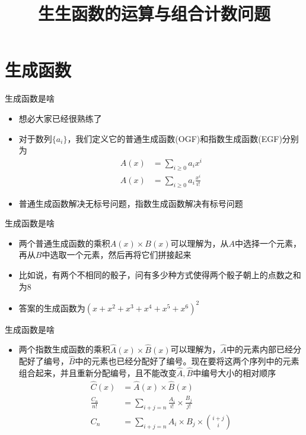 \documentclass{beamer}
\begin{document}
 

\begin{frame}
    \title{生生函数的运算与组合计数问题} 
    \begin{titlepage}
    \end{titlepage}
\end{frame} 

\section{生成函数} 

\begin{frame}{生成函数是啥}
    \begin{itemize}
        \item 想必大家已经很熟练了
        \item 对于数列$\{a_i\}$，我们定义它的普通生成函数(OGF)和指数生成函数(EGF)分别为
        $$\begin{aligned}
            A(x) &= \sum_{i\geq 0} a_i x^i\\
            \hat A(x) &= \sum_{i\geq 0} a_i \frac{x^i}{i!}
        \end{aligned}$$\pause
        \item 普通生成函数解决无标号问题，指数生成函数解决有标号问题
    \end{itemize}
\end{frame}

\begin{frame}{生成函数是啥}
    \begin{itemize}
        \item 两个普通生成函数的乘积$A(x)\times B(x)$可以理解为，从$A$中选择一个元素，再从$B$中选取一个元素，然后再将它们拼接起来\pause
        \item 比如说，有两个不相同的骰子，问有多少种方式使得两个骰子朝上的点数之和为8\pause
        \item 答案的生成函数为$(x + x^2 + x^3 + x^4 + x^5 + x^6)^2$
    \end{itemize}
\end{frame}

\begin{frame}{生成函数是啥}
    \begin{itemize}
        \item 两个指数生成函数的乘积$\hat A(x)\times \hat B(x)$可以理解为，$\hat A$中的元素内部已经分配好了编号，$\hat B$中的元素也已经分配好了编号。现在要将这两个序列中的元素组合起来，并且重新分配编号，且不能改变$\hat A,\hat B$中编号大小的相对顺序\pause
        $$\begin{aligned}
            \hat C(x) &= \hat A(x)\times \hat B(x)\\
            \frac{C_n}{n!} &= \sum_{i + j = n}\frac{A_i}{i!}\times \frac{B_j}{j!}\\
            C_n &= \sum_{i + j = n}A_i\times B_j\times {i + j\choose i}
        \end{aligned}$$
    \end{itemize}
\end{frame}
\end{document}
